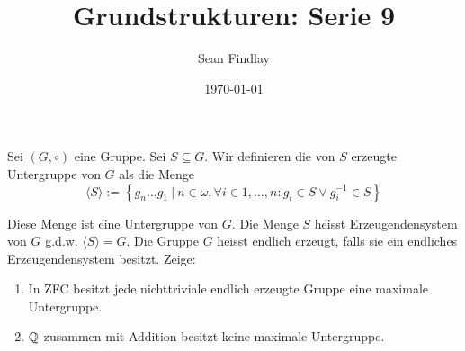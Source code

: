 \documentclass[12pt]{article}
\title{Grundstrukturen: Serie 9}
\author{Sean Findlay}
\date{\today}
\begin{document}
\maketitle

\begin{problem}[Aufgabe]{}{}
    Sei $(G, \circ)$ eine Gruppe. Sei $S \subseteq G$. Wir definieren die von $S$ erzeugte Untergruppe von $G$ als die Menge
    $$
        \langle S \rangle := \left\{ g_n \dots g_1 \ |\ n \in \omega, \forall i \in {1,\dots,n} : g_i \in S \lor g_i^{-1} \in S \right\}
    $$

    Diese Menge ist eine Untergruppe von $G$. Die Menge $S$ heisst Erzeugendensystem von $G$ g.d.w. $\langle S \rangle = G$. Die Gruppe $G$ heisst endlich erzeugt, falls sie ein endliches Erzeugendensystem besitzt. Zeige:
    \begin{enumerate}[label=\alph*)]
        \item In ZFC besitzt jede nichttriviale endlich erzeugte Gruppe eine maximale Untergruppe.
        \item $\mathbb{Q}$ zusammen mit Addition besitzt keine maximale Untergruppe.
    \end{enumerate}
\end{problem}
\end{document}
